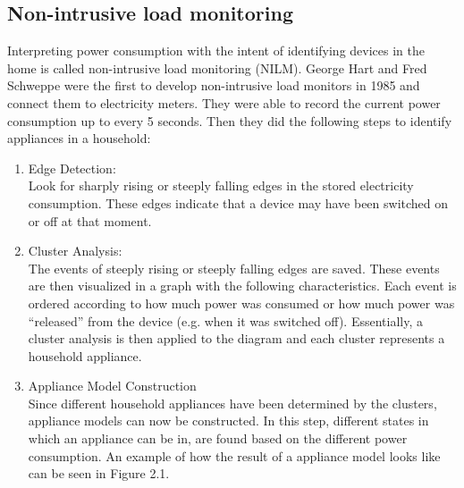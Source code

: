 \subsection{Non-intrusive load monitoring} 

Interpreting power consumption with the intent of identifying devices in the home is called non-intrusive load monitoring (NILM). George Hart and Fred Schweppe were the first to develop non-intrusive load monitors in 1985 and connect them to electricity meters. They were able to record the current power consumption up to every 5 seconds. Then they did the following steps to identify appliances in a household:
\begin{enumerate}
\item Edge Detection:\\
Look for sharply rising or steeply falling edges in the stored electricity consumption. These edges indicate that a device may have been switched on or off at that moment.
\item Cluster Analysis:\\ 
The events of steeply rising or steeply falling edges are saved. These events are then visualized in a graph with the following characteristics. Each event is ordered according to how much power was consumed or how much power was 	``released'' from the device (e.g. when it was switched off).
Essentially, a cluster analysis is then applied to the diagram and each  cluster represents a household appliance.
\item Appliance Model Construction\\
Since different household appliances have been determined by the clusters, appliance models can now be constructed. In this step, different states in which an appliance can be in, are found based on the different power consumption. An example of how the result of a appliance model looks like can be seen in Figure 2.1.



\end{enumerate}
